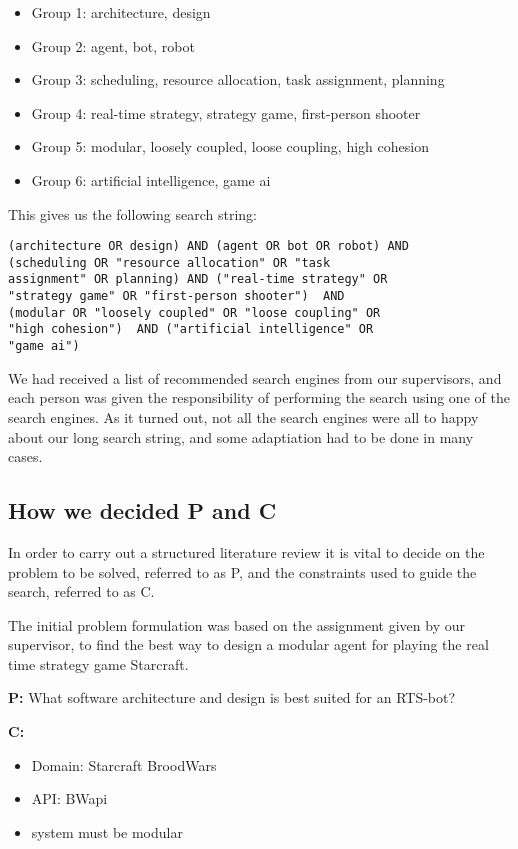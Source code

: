 \begin{itemize}

\item Group 1: architecture, design
\item Group 2: agent, bot, robot
\item Group 3: scheduling, resource allocation, task assignment, planning
\item Group 4: real-time strategy, strategy game, first-person shooter
\item Group 5: modular, loosely coupled, loose coupling, high cohesion
\item Group 6: artificial intelligence, game ai

\end{itemize}
This gives us the following search  string:
\begin{lstlisting}
(architecture OR design) AND (agent OR bot OR robot) AND 
(scheduling OR "resource allocation" OR "task 
assignment" OR planning) AND ("real-time strategy" OR 
"strategy game" OR "first-person shooter")  AND 
(modular OR "loosely coupled" OR "loose coupling" OR 
"high cohesion")  AND ("artificial intelligence" OR 
"game ai")
\end{lstlisting}
We had received a list of recommended search engines from our supervisors, and each person was given the responsibility of performing the search using one of the search engines. As it turned out, not all the search engines were all to happy about our long search string, and some adaptiation had to be done in many cases.

\subsection{How we decided P and C}
\label{sub:how_we_decided_p_and_c}
In order to carry out a structured literature review it is vital to decide on the problem to be solved, referred to as P, and the constraints used to guide the search, referred to as C.

The initial problem formulation was based on the assignment given by our supervisor, to find the best way to design a modular agent for playing the real time strategy game Starcraft.  

\textbf{P:} What software architecture and design is best suited for an RTS-bot?

\textbf{C:}
\begin{itemize}
\item Domain: Starcraft BroodWars
\item API: BWapi
\item system must be modular	
\end{itemize}


